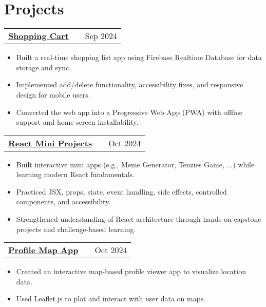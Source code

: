 \documentclass[a4paper,10pt]{article}
\makeatletter
\newenvironment{joblong}[2]
    {
    \begin{tabularx}{\linewidth}{@{}l X r@{}}
    \textbf{#1} & \hfill &  #2 \\[3.75pt]
    \end{tabularx}
    \begin{minipage}[t]{\linewidth}
    \begin{itemize}[nosep,after=\strut, leftmargin=1em, itemsep=3pt,label=--]
    }
    {
    \end{itemize}
    \end{minipage}    
    }
\makeatother
\begin{document}
\section{Projects}


    \begin{joblong}
        {\href{https://github.com/gauravgorane/Shopping_cart}{Shopping Cart \faExternalLink*} \normalfont{\textit{[JavaScript, Tailwind CSS, Firebase, PWA]}}}{Sep 2024}
        \item Built a real-time shopping list app using Firebase Realtime Database for data storage and sync. 
        \item Implemented add/delete functionality, accessibility fixes, and responsive design for mobile users.
        \item Converted the web app into a Progressive Web App (PWA) with offline support and home screen installability.
    \end{joblong}

    \begin{joblong}
        {\href{https://github.com/gauravgorane/React_mini_projects}{React Mini Projects \faExternalLink*} \normalfont{\textit{[React, React Hooks, Components]}}}{Oct 2024}
        \item Built interactive mini apps (e.g., Meme Generator, Tenzies Game, ...) while learning modern React fundamentals.
        \item Practiced JSX, props, state, event handling, side effects, controlled components, and accessibility.
        \item Strengthened understanding of React architecture through hands-on capstone projects and challenge-based learning.
    \end{joblong}

    \begin{joblong}
        {\href{https://github.com/gauravgorane/profile-map-app}{Profile Map App \faExternalLink*} \normalfont{\textit{[React, React Router, Leaflet, Tailwind CSS]}}}{Oct 2024}
        \item Created an interactive map-based profile viewer app to visualize location data.
        \item Used Leaflet.js to plot and interact with user data on maps.
    \end{joblong}
\end{document}
